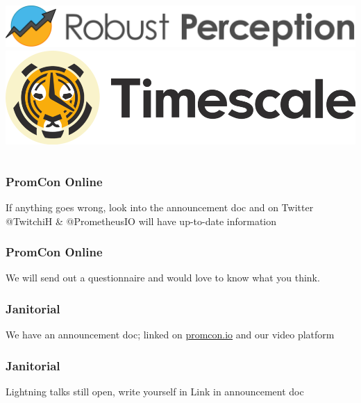 \documentclass[aspectratio=169]{beamer}
\begin{document}
\begin{frame}
\begin{columns}[t]
        \centering
                \includegraphics[scale=0.08]{images/robust_perception.png}\\
                \vspace{1.5cm}
                \includegraphics[scale=0.1]{images/timescale.png}
        \end{columns}
\end{frame}


\begin{frame}
	\frametitle{PromCon Online}
	\centering
	\vfill
	If anything goes wrong, look into the announcement doc and on Twitter
	\vfill
	@TwitchiH \& @PrometheusIO will have up-to-date information
	\vfill
\end{frame}

\begin{frame}
	\frametitle{PromCon Online}
	\centering
	\vfill
	We will send out a questionnaire and would love to know what you think.
	\vfill
\end{frame}

\begin{frame}
	\frametitle{Janitorial}
	\centering
	\vfill
	We have an announcement doc; linked on \url{promcon.io} and our video platform
	\vfill
\end{frame}

\begin{frame}
	\frametitle{Janitorial}
	\centering
	\vfill
	Lightning talks still open, write yourself in
	\vfill
	Link in announcement doc
	\vfill
\end{frame}
\end{document}
